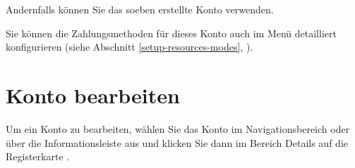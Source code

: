Andernfalls können Sie das soeben erstellte Konto verwenden.

Sie können die Zahlungsmethoden für dieses Konto auch im Menü  detailliert konfigurieren (siehe Abschnitt \vref{setup-resources-modes}, ).


\section{Konto bearbeiten\label{accounts-modify}}%

Um ein Konto zu bearbeiten, wählen Sie das Konto im Navigationsbereich oder über die Informationsleiste aus und klicken Sie dann im Bereich Details auf die Registerkarte .

